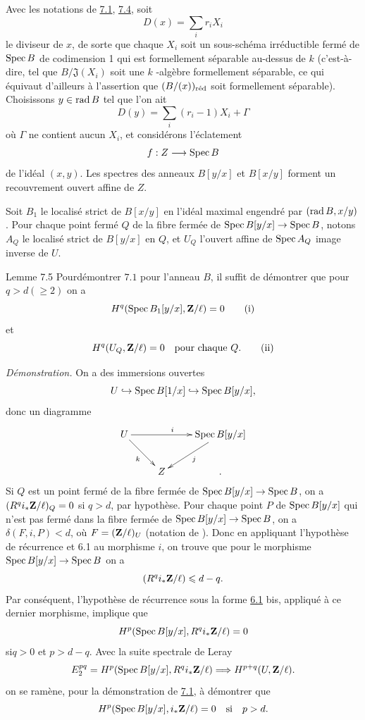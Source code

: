 \documentclass[10pt]{../fichiers-configuration-latex/smfart}
\begin{document}
Avec les notations de \hyperref[XIX.lem7.1]{7.1}, \hyperref[XIX.cor7.4]{7.4}, soit
$$
D(x)=\sum_{i}r_{i}X_{i}
$$
le diviseur de $x$, de sorte que chaque $X_{i}$ soit un sous-schéma
irréductible fermé de $\operatorname{Spec} B$ de codimension 1 qui est formellement
séparable au-dessus de $k$ (c'est-à-dire, tel que
$B/\mathfrak{J}(X_{i})$ soit une $k$ -algèbre formellement séparable,
ce qui équivaut d'ailleurs à l'assertion que $(B/(x))_{\text{\rm
réd}}$ soit formellement séparable). Choisissons $y\in\operatorname{rad} B$ tel que
l'on ait
$$
D(y)=\sum_{i}(r_{i}-1)X_{i}+\Gamma
$$
où $\Gamma$ ne contient aucun $X_{i}$, et considérons l'éclatement
$$
f:Z\longrightarrow \operatorname{Spec} B
$$
de l'idéal $(x,y)$. Les spectres des anneaux $B[y/x]$ et $B[x/y]$
forment un recouvrement ouvert affine de $Z$.

Soit $B_{1}$ le localisé strict de $B[x/y]$ en l'idéal maximal
engendré par $(\operatorname{rad} B,x/y)$. Pour chaque point fermé $Q$ de la fibre
fermée de $\operatorname{Spec} B[y/x]\rightarrow \operatorname{Spec} B$, notons $A_{Q}$ le
localisé strict de $B[y/x]$ en $Q$, et $U_{Q}$ l'ouvert affine de
$\operatorname{Spec} A_{Q}$ image inverse de $U$.

\begin{enonce*}{Lemme 7.5}
Pour\pageoriginale démontrer $7.1$ pour l'anneau $B$, il suffit de
démontrer que pour $q>d(\geq 2)$ on a
\begin{equation*}
H^{q}(\operatorname{Spec} B_{1}[y/x],\mathbf{Z}/\ell)=0\tag{i}
\end{equation*}
et
\begin{equation*}
H^{q}(U_{Q},\mathbf{Z}/\ell)=0\quad\text{pour chaque $Q$}{}.\tag{ii}
\end{equation*}
\end{enonce*}

\medskip
\noindent
\emph{Démonstration.} On a des immersions ouvertes
$$
U\hookrightarrow \operatorname{Spec} B[1/x]\hookrightarrow \operatorname{Spec} B[y/x]{},
$$
donc un diagramme
$$
\xymatrix{
U \ar[rr]^{i} \ar[rd]_{k}&         & \Spec B[y/x] \ar[ld]^j\\
                        &   Z     &      . 
}
$$
Si $Q$ est un point fermé de la fibre fermée de $\operatorname{Spec}
B[y/x]\rightarrow \operatorname{Spec} B$, on a
$(R^{q}i_{\ast}\mathbf{Z}/\ell)_{Q}=0$ si $q>d$, par hypothèse. Pour
chaque point $P$ de $\operatorname{Spec} B[y/x]$ qui n'est pas fermé dans la fibre
fermée de $\operatorname{Spec} B[y/x]\rightarrow \operatorname{Spec} B$, on a $\delta(F,i,P)<d$,
où $F=(\mathbf{Z}/\ell)_{U}$ (notation de ). Donc en appliquant
l'hypothèse de récurrence et 6.1 au morphisme $i$, on trouve que pour
le morphisme $\operatorname{Spec} B[y/x]\rightarrow \operatorname{Spec} B$ on a
$$
(R^{q}i_{\ast}\mathbf{Z}/\ell)\leqslant d-q{}.
$$
Par conséquent, l'hypothèse de récurrence sous la forme \hyperref[XIX.thm6.1]{6.1} bis,
appliqué à ce dernier morphisme, implique que 
$$
H^{p}(\operatorname{Spec} B[y/x],R^{q}i_{\ast}\mathbf{Z}/\ell)=0
$$
si\pageoriginale $q>0$ et $p>d-q$. Avec la suite spectrale de Leray
$$
E^{pq}_{2}=H^{p}(\operatorname{Spec}
B[y/x],R^{q}i_{\ast}\mathbf{Z}/\ell)\Longrightarrow
H^{p+q}(U,\mathbf{Z} / \ell){}.
$$
on se ramène, pour la démonstration de \hyperref[XIX.lem7.1]{7.1}, à démontrer que
$$
H^{p}(\operatorname{Spec} B[y/x],i_{\ast}\mathbf{Z}/\ell)=0\quad\text{\rm si}\quad
p>d{}.
$$
\end{document}
